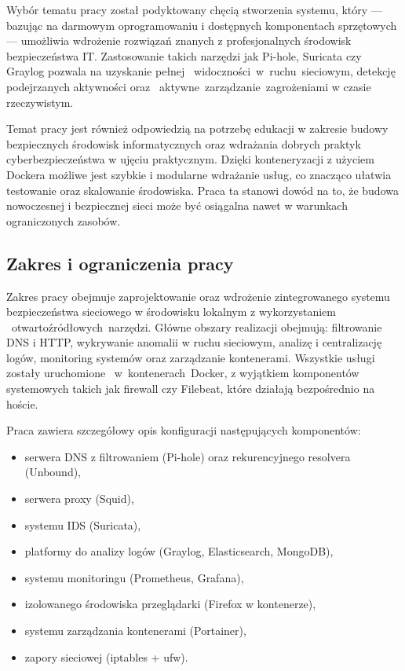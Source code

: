 \documentclass[
    left=2.5cm,         %
    right=2.5cm,        %
    top=2.5cm,          %
    bottom=3cm,         %
    bindingoffset=6mm,  %
    nohyphenation=true %
]{eiti/eiti-thesis} %
\begin{document}
Wybór tematu pracy został podyktowany chęcią stworzenia systemu, który — bazując na darmowym oprogramowaniu i dostępnych komponentach sprzętowych — umożliwia wdrożenie rozwiązań znanych z profesjonalnych środowisk bezpieczeństwa IT. Zastosowanie takich narzędzi jak Pi-hole, Suricata czy Graylog pozwala na uzyskanie pełnej ~widoczności~w~ruchu~sieciowym, detekcję podejrzanych aktywności oraz ~aktywne~zarządzanie~zagrożeniami w czasie rzeczywistym.

Temat pracy jest również odpowiedzią na potrzebę edukacji w zakresie budowy bezpiecznych środowisk informatycznych oraz wdrażania dobrych praktyk cyberbezpieczeństwa w ujęciu praktycznym. Dzięki konteneryzacji z użyciem Dockera możliwe jest szybkie i modularne wdrażanie usług, co znacząco ułatwia testowanie oraz skalowanie środowiska. Praca ta stanowi dowód na to, że budowa nowoczesnej i bezpiecznej sieci może być osiągalna nawet w warunkach ograniczonych zasobów.

\subsection{Zakres i ograniczenia pracy}

Zakres pracy obejmuje zaprojektowanie oraz wdrożenie zintegrowanego systemu bezpieczeństwa sieciowego w środowisku lokalnym z wykorzystaniem ~otwartoźródłowych~narzędzi. Główne obszary realizacji obejmują: filtrowanie DNS i HTTP, wykrywanie anomalii w ruchu sieciowym, analizę i centralizację logów, monitoring systemów oraz zarządzanie kontenerami. Wszystkie usługi zostały uruchomione ~w~kontenerach~Docker, z wyjątkiem komponentów systemowych takich jak firewall czy Filebeat, 
które działają bezpośrednio na hoście.

Praca zawiera szczegółowy opis konfiguracji następujących komponentów:
\begin{itemize}
    \item serwera DNS z filtrowaniem (Pi-hole) oraz rekurencyjnego resolvera (Unbound),
    \item serwera proxy (Squid),
    \item systemu IDS (Suricata),
    \item platformy do analizy logów (Graylog, Elasticsearch, MongoDB),
    \item systemu monitoringu (Prometheus, Grafana),
    \item izolowanego środowiska przeglądarki (Firefox w kontenerze),
    \item systemu zarządzania kontenerami (Portainer),
    \item zapory sieciowej (iptables + ufw).
\end{itemize}
\end{document}
